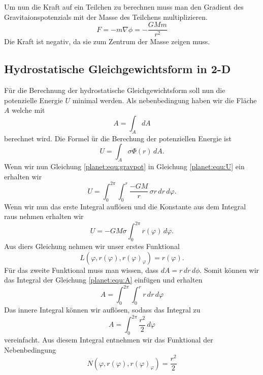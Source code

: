 Um nun die Kraft auf ein Teilchen zu berechnen muss man den Gradient des Gravitaionspotenzials mit der Masse des Teilchens multiplizieren.
\begin{equation}
	F = -m\nabla \phi = -\frac{GMm}{r^2}
\end{equation}
Die Kraft ist negativ, da sie zum Zentrum der Masse zeigen muss.


\subsection{Hydrostatische Gleichgewichtsform in 2-D}
Für die Berechnung der hydrostatische Gleichgewichtsform soll nun die potenzielle Energie \(U\) minimal werden.
Als nebenbedingung haben wir die Fläche \(A\) welche mit 
\begin{equation}
	A = \int_{A}^{} dA
	\label{planet:equ:A}
\end{equation}
berechnet wird.
Die Formel ür die Berechung der potenziellen Energie ist
\begin{equation*}
	U = \int_{A} \sigma  \Phi (r) \, dA.
	\label{planet:equ:U}
\end{equation*}
Wenn wir nun Gleichung \ref{planet:equ:gravpot} in Gleichung \ref{planet:equ:U} ein erhalten wir
\begin{equation*}
	U = \int_{0}^{2\pi}\int_{0}^{r} \frac{-GM}{r} \, \sigma r \, dr \, d\varphi.
\end{equation*}
Wenn wir nun das erste Integral auflösen und die Konstante aus dem Integral raus nehmen erhalten wir 
\begin{equation}
	U =-GM\sigma \int_{0}^{2\pi} r(\varphi) \, d\varphi .
\end{equation}
Aus diers Gleichung nehmen wir unser erstes Funktional
\begin{equation}
	L(\varphi ,r(\varphi),r(\varphi)_\varphi) = r(\varphi).
\end{equation}
Für das zweite Funktional muss man wissen, dass \(dA = r \, dr \, d\phi\).
Somit können wir das Integral der Gleichung \ref{planet:equ:A} einfügen und erhalten
\begin{equation*}
	A = \int_{0}^{2\pi}\int_{0}^{r} r \, dr \, d\varphi
\end{equation*}
Das innere Integral können wir auflösen, sodass das Integral zu
\begin{equation*}
	A = \int_{0}^{2\pi}\frac{r^2}{2} \, d\varphi
\end{equation*}
vereinfacht.
Aus diesem Integral entnehmen wir das Funktional der Nebenbedingung
\begin{equation*}
	N(\varphi ,r(\varphi),r(\varphi)_\varphi) = \frac{r^2}{2} 
\end{equation*}

